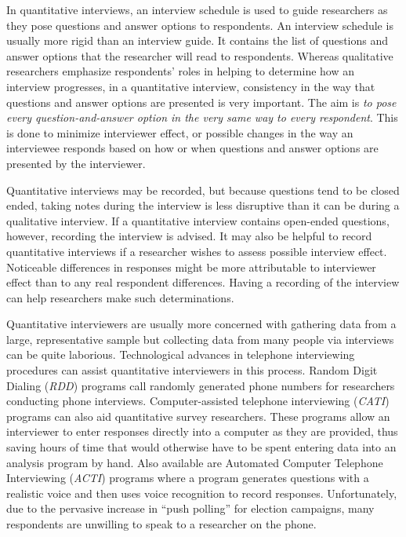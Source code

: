 In quantitative interviews, an interview schedule is used to guide researchers as they pose questions and answer options to respondents. An interview schedule is usually more rigid than an interview guide. It contains the list of questions and answer options that the researcher will read to respondents. Whereas qualitative researchers emphasize respondents' roles in helping to determine how an interview progresses, in a quantitative interview, consistency in the way that questions and answer options are presented is very important. The aim is \textit{to pose every question-and-answer option in the very same way to every respondent}. This is done to minimize interviewer effect, or possible changes in the way an interviewee responds based on how or when questions and answer options are presented by the interviewer.

Quantitative interviews may be recorded, but because questions tend to be closed ended, taking notes during the interview is less disruptive than it can be during a qualitative interview. If a quantitative interview contains open-ended questions, however, recording the interview is advised. It may also be helpful to record quantitative interviews if a researcher wishes to assess possible interview effect. Noticeable differences in responses might be more attributable to interviewer effect than to any real respondent differences. Having a recording of the interview can help researchers make such determinations.

Quantitative interviewers are usually more concerned with gathering data from a large, representative sample but collecting data from many people via interviews can be quite laborious. Technological advances in telephone interviewing procedures can assist quantitative interviewers in this process. Random Digit Dialing (\textit{RDD}) programs call randomly generated phone numbers for researchers conducting phone interviews. Computer-assisted telephone interviewing (\textit{CATI}) programs can also aid quantitative survey researchers. These programs allow an interviewer to enter responses directly into a computer as they are provided, thus saving hours of time that would otherwise have to be spent entering data into an analysis program by hand. Also available are Automated Computer Telephone Interviewing (\textit{ACTI}) programs where a program generates questions with a realistic voice and then uses voice recognition to record responses. Unfortunately, due to the pervasive increase in ``push polling'' for election campaigns, many respondents are unwilling to speak to a researcher on the phone.


